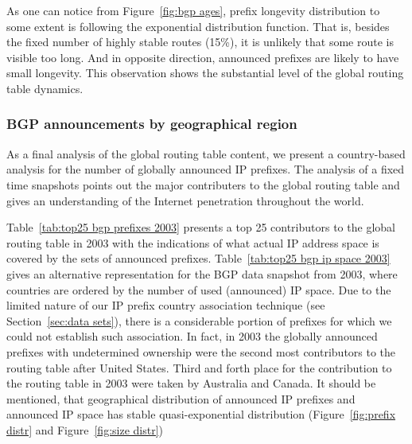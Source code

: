 As one can notice from Figure~\ref{fig:bgp ages}, prefix longevity
distribution to some extent is following the exponential distribution
function. That is, besides the fixed number of highly stable routes (15\%), it
is unlikely that some route is visible too long. And in opposite direction,
announced prefixes are likely to have small longevity. This observation shows
the substantial level of the global routing table dynamics.

\subsubsection{BGP announcements by geographical region}

As a final analysis of the global routing table content, we present a country-based analysis for the number of globally announced IP prefixes. The analysis of a fixed time snapshots points out the major contributers to the global routing table and gives an understanding of the Internet penetration throughout the world. 

Table~\ref{tab:top25 bgp prefixes 2003} presents a top 25 contributors to the
global routing table in 2003 with the indications of what actual IP address
space is covered by the sets of announced prefixes. Table~\ref{tab:top25 bgp
ip space 2003} gives an alternative representation for the BGP data snapshot
from 2003, where countries are ordered by the number of used (announced) IP
space. Due to the limited nature of our IP prefix country association
technique (see Section~\ref{sec:data sets}), there is a considerable portion
of prefixes for which we could not establish such association. In fact, in
2003 the globally announced prefixes with undetermined ownership were the
second most contributors to the routing table after United States. Third and
forth place for the contribution to the routing table in 2003 were taken by
Australia and Canada. It should be mentioned, that geographical distribution
of announced IP prefixes and announced IP space has stable quasi-exponential
distribution (Figure~\ref{fig:prefix distr} and Figure~\ref{fig:size distr})

